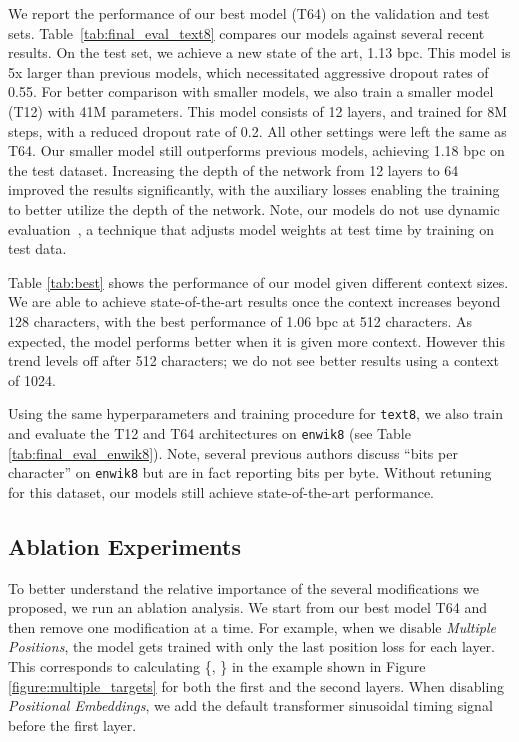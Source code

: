 \documentclass[letterpaper]{article}
\newcommand{\texteight}{\texttt{text8}}
\newcommand{\enwikeight}{\texttt{enwik8}}
\newcommand{\bigmodel}{\textsc{T64}}
\newcommand{\smallmodel}{\textsc{T12}}
\begin{document}
We report the performance of our best model (\bigmodel) on the validation and test sets.
Table~\ref{tab:final_eval_text8} compares our models against several recent results.
On the test set, we achieve a new state of the art, 1.13 bpc.
This model is 5x larger than previous models, which necessitated aggressive dropout rates of 0.55.
For better comparison with smaller models, we also train a smaller model (\smallmodel) with 41M parameters.
This model consists of 12 layers, and trained for 8M steps, with a reduced dropout rate of 0.2.
All other settings were left the same as \bigmodel{}.
Our smaller model still outperforms previous models, achieving 1.18 bpc on the test dataset. Increasing the depth of the network from 12 layers to 64 improved the results significantly, with the auxiliary losses enabling the training to better utilize the depth of the network. Note, our models do not use dynamic evaluation~\cite{krause2017dynamic}, a technique that adjusts model weights at test time by training on test data.



Table \ref{tab:best} shows the performance of our model given different context sizes.
We are able to achieve state-of-the-art results once the context increases beyond 128 characters, with the best performance of 1.06 bpc at 512 characters.
As expected, the model performs better when it is given more context. However this trend levels off after 512 characters; we do not see better results using a context of 1024.



Using the same hyperparameters and training procedure for \texteight{}, we also train and evaluate the \smallmodel{} and \bigmodel{} architectures on \enwikeight{} (see Table \ref{tab:final_eval_enwik8}).
Note, several previous authors discuss ``bits per character'' on \enwikeight{} but are in fact reporting bits per byte.
Without retuning for this dataset, our models still achieve state-of-the-art performance.




\subsection{Ablation Experiments}
\label{section:ablation}

To better understand the relative importance of the several modifications we proposed, we run an ablation analysis.
We start from our best model \bigmodel{} and then remove one modification at a time.
For example, when we disable \emph{Multiple Positions}, the model gets trained with only the last position loss for each layer.
This corresponds to calculating \{, \} in the example shown in Figure \ref{figure:multiple_targets} for both the first and the second layers.
When disabling \emph{Positional Embeddings}, we add the default transformer sinusoidal timing signal before the first layer.
\end{document}
